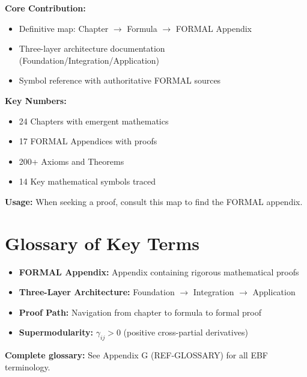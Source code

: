 \begin{tcolorbox}[colback=blue!5!white, colframe=blue!75!black,
    title=\textbf{Appendix FM Summary}]

\textbf{Core Contribution:}
\begin{itemize}[nosep]
    \item Definitive map: Chapter $\rightarrow$ Formula $\rightarrow$ FORMAL Appendix
    \item Three-layer architecture documentation (Foundation/Integration/Application)
    \item Symbol reference with authoritative FORMAL sources
\end{itemize}

\textbf{Key Numbers:}
\begin{itemize}[nosep]
    \item 24 Chapters with emergent mathematics
    \item 17 FORMAL Appendices with proofs
    \item 200+ Axioms and Theorems
    \item 14 Key mathematical symbols traced
\end{itemize}

\textbf{Usage:} When seeking a proof, consult this map to find the FORMAL appendix.

\end{tcolorbox}

\section{Glossary of Key Terms}
\label{sec:fm-glossary}

\begin{itemize}[nosep]
    \item \textbf{FORMAL Appendix:} Appendix containing rigorous mathematical proofs
    \item \textbf{Three-Layer Architecture:} Foundation $\rightarrow$ Integration $\rightarrow$ Application
    \item \textbf{Proof Path:} Navigation from chapter to formula to formal proof
    \item \textbf{Supermodularity:} $\gamma_{ij} > 0$ (positive cross-partial derivatives)
\end{itemize}

\medskip
\textbf{Complete glossary:} See Appendix G (REF-GLOSSARY) for all EBF terminology.


